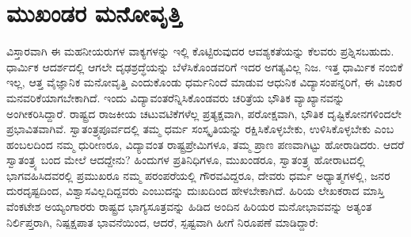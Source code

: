 \section*{ಮುಖಂಡರ ಮನೋವೃತ್ತಿ}


ವಿಸ್ತಾರವಾಗಿ ಈ ಮಹನೀಯರುಗಳ ವಾಕ್ಯಗಳನ್ನು ಇಲ್ಲಿ ಕೊಟ್ಟಿರುವುದರ ಆವಶ್ಯಕತೆಯನ್ನು ಕೆಲವರು ಪ್ರಶ್ನಿಸಬಹುದು. ಧಾರ್ಮಿಕ ಆದರ್ಶದಲ್ಲಿ ಆಗಲೇ ದೃಢಶ್ರದ್ಧೆಯನ್ನು ಬೆಳೆಸಿಕೊಂಡವರಿಗೆ ಇದರ ಅಗತ್ಯವಿಲ್ಲ ನಿಜ. ಇತ್ತ ಧಾರ್ಮಿಕ ನಂಬಿಕೆ ಇಲ್ಲ, ಆತ್ತ ವೈಜ್ಞಾನಿಕ ಮನೋವೃತ್ತಿ ಎಂದುಕೊಂಡು ಧರ್ಮನಿಂದೆ ಮಾಡುವ ಆಧುನಿಕ ವಿದ್ಯಾಸಂಪನ್ನರಿಗೆ, ಈ ವಿಚಾರ ಮನವರಿಕೆಯಾಗ\-ಬೇಕಾಗಿದೆ. ಇಂದು ವಿದ್ಯಾವಂತರೆನ್ನಿಸಿಕೊಂಡವರು ಚರಿತ್ರೆಯ ಭೌತಿಕ ವ್ಯಾಖ್ಯಾನವನ್ನು ಅಂಗೀ\-ಕರಿಸಿ\-ದ್ದಾರೆ. ರಾಷ್ಟ್ರದ ರಾಜಕೀಯ ಚಟುವಟಿಕೆಗಳೆಲ್ಲ ಪ್ರತ್ಯಕ್ಷವಾಗಿ, ಪರೋಕ್ಷವಾಗಿ, ಭೌತಿಕ ದೃಷ್ಟಿಕೋನಗಳಿಂದಲೇ ಪ್ರಭಾವಿತವಾಗಿವೆ. ಸ್ವಾತಂತ್ರ್ಯಪೂರ್ವದಲ್ಲಿ ತಮ್ಮ ಧರ್ಮ ಸಂಸ್ಕೃತಿಯನ್ನು ರಕ್ಷಿಸಿಕೊಳ್ಳಬೇಕು, ಉಳಿಸಿಕೊಳ್ಳಬೇಕು ಎಂಬ ಹಂಬಲದಿಂದ ನಮ್ಮ ಧುರೀಣರೂ, ವಿದ್ಯಾವಂತ ರಾಷ್ಟ್ರಪ್ರೇಮಿಗಳೂ, ತಮ್ಮ ಪ್ರಾಣ ಪಣವಾಗಿಟ್ಟು ಹೋರಾಡಿದರು. ಆದರೆ ಸ್ವಾತಂತ್ರ್ಯ ಬಂದ ಮೇಲೆ ಆದದ್ದೇನು? ಹಿಂದುಗಳ ಪ್ರತಿನಿಧಿಗಳೂ, ಮುಖಂಡರೂ, ಸ್ವಾತಂತ್ರ್ಯ ಹೋರಾಟದಲ್ಲಿ ಭಾಗವಹಿಸಿದವರಲ್ಲಿ ಪ್ರಮುಖರೂ ನಮ್ಮ ಪರಂಪರೆಯಲ್ಲಿ ಗೌರವವಿದ್ದರೂ, ದೇವರು ಧರ್ಮ ಅಧ್ಯಾತ್ಮಗಳಲ್ಲಿ, ಜನರ ದುರದೃಷ್ಟದಿಂದ, ವಿಶ್ವಾಸವಿಲ್ಲದಿದ್ದವರು ಎಂಬುದನ್ನು ದುಃಖದಿಂದ ಹೇಳಬೇಕಾಗಿದೆ. ಹಿರಿಯ ಲೇಖಕರಾದ ಮಾಸ್ತಿ ವೆಂಕಟೇಶ ಅಯ್ಯಂಗಾರರು ರಾಷ್ಟ್ರದ ಭಾಗ್ಯಸೂತ್ರವನ್ನು ಹಿಡಿದ ಅಂದಿನ ಹಿರಿಯರ ಮನೋಭಾವವನ್ನು ಅತ್ಯಂತ ನಿರ್ಲಿಪ್ತರಾಗಿ, ನಿಷ್ಪಕ್ಷಪಾತ ಭಾವನೆಯಿಂದ, ಆದರೆ, ಸ್ಪಷ್ಟವಾಗಿ ಹೀಗೆ ನಿರೂಪಣೆ ಮಾಡಿದ್ದಾರೆ:

